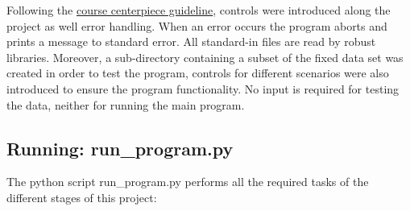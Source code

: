 \documentclass[12pt]{article}
\begin{document}
Following the \href{https://journals.plos.org/ploscompbiol/article?id=10.1371/journal.pcbi.1000424#s6}{course centerpiece guideline}, controls were introduced along the project as well error handling. When an error occurs the program aborts and prints a message to standard error. All standard-in files are read by robust libraries. 
Moreover, a sub-directory containing a subset of the fixed data set was created in order to test the program, controls for different scenarios were also introduced to ensure the program functionality. No input is required for testing the data, neither for running the main program.\\

\subsection{Running: run\_program.py}

The python script run\_program.py performs all the required tasks of the different stages of this project:
\end{document}

